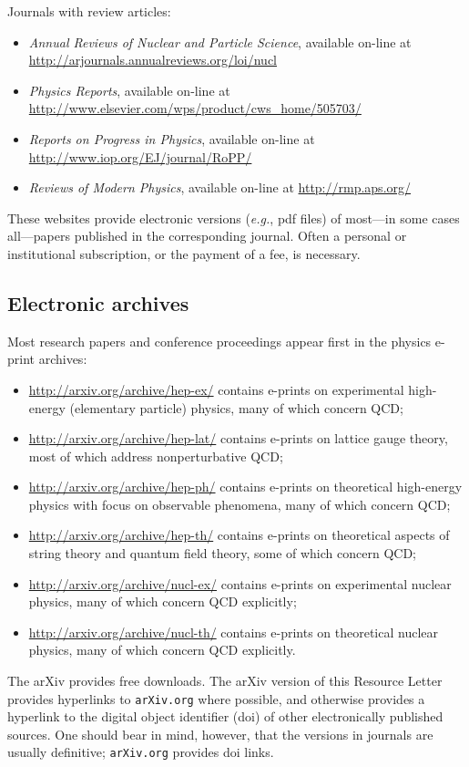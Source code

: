 \documentclass[11pt,prb,groupedaddress,nofootinbib,showpacs,floatfix]{revtex4-1}
\newcommand{\eg}{{\em e.g.}}
\begin{document}
Journals with review articles:
\begin{itemize}
	\item \emph{Annual Reviews of Nuclear and Particle Science}, 
	available on-line at 
	\url{http://arjournals.annualreviews.org/loi/nucl}
	\item \emph{Physics Reports}, available on-line at 
	\url{http://www.elsevier.com/wps/product/cws_home/505703/}
	\item \emph{Reports on Progress in Physics}, available on-line at 
	\url{http://www.iop.org/EJ/journal/RoPP/}
	\item \emph{Reviews of Modern Physics}, available on-line at 
	\url{http://rmp.aps.org/}
\end{itemize}

These websites provide electronic versions (\eg, pdf files) of
most---in some cases all---papers published in the corresponding journal.
Often a personal or institutional subscription, or the payment of a fee, 
is necessary.

\subsection{Electronic archives}
Most research papers and conference proceedings appear first in the 
physics e-print archives:
\begin{itemize}
	\item \url{http://arxiv.org/archive/hep-ex/} contains e-prints on 
	experimental high-energy (elementary particle) physics, many of 
	which concern QCD;
	\item \url{http://arxiv.org/archive/hep-lat/} contains e-prints on 
	lattice gauge theory, most of which address nonperturbative QCD;
	\item \url{http://arxiv.org/archive/hep-ph/} contains e-prints on 
	theoretical high-energy physics with focus on observable phenomena, 
	many of which concern QCD;
	\item \url{http://arxiv.org/archive/hep-th/} contains e-prints on 
	theoretical aspects of string theory and quantum field theory,
	some of which concern QCD;
	\item \url{http://arxiv.org/archive/nucl-ex/} contains e-prints on 
	experimental nuclear physics, many of which concern QCD explicitly;
	\item \url{http://arxiv.org/archive/nucl-th/} contains e-prints on 
	theoretical nuclear physics, many of which concern QCD explicitly.
\end{itemize}
The arXiv provides free downloads.
The arXiv version of this Resource Letter provides hyperlinks to 
\texttt{arXiv.org} where possible, and otherwise provides a hyperlink
to the digital object identifier (doi) of other electronically 
published sources.
One should bear in mind, however, that the versions in journals are 
usually definitive; \texttt{arXiv.org} provides doi links.
\end{document}
